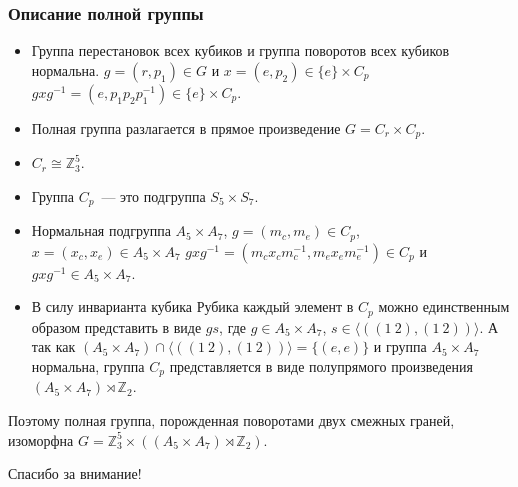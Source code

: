 \documentclass[utf8,russian]{beamer}
\begin{document}
\begin{frame}
\frametitle{Описание полной группы}
\begin{itemize}
	\item Группа перестановок всех кубиков и группа поворотов всех кубиков нормальна. $g=(r,p_1)\in G$ и $x=(e,p_2)\in \{e\}\times C_p$ $gxg^{-1}=(e,p_1p_2p_1^{-1})\in \{e\}\times C_p$.
	\item Полная группа разлагается в прямое произведение $G=C_r\times C_p$.
	\item $C_r\cong \mathbb{Z}_3^5$.
	\item Группа $C_p$~--- это подгруппа $S_5\times S_7$.
	\item Нормальная подгруппа $A_5\times A_7$, $g=(m_c,m_e)\in C_p$, $x=(x_c,x_e)\in A_5\times A_7$ $gxg^{-1}=(m_cx_cm_c^{-1},m_ex_em_e^{-1})\in C_p$ и $gxg^{-1}\in A_5\times A_7$.
	\item В силу инварианта кубика Рубика каждый элемент в $C_p$ можно единственным образом представить в виде $gs$, где $g\in A_5\times A_7$, $s\in \langle((1~2),(1~2))\rangle$.
	А так как $(A_5\times A_7)\cap \langle((1~2),(1~2))\rangle=\{(e,e)\}$ и группа $A_5\times A_7$ нормальна, группа $C_p$ представляется в виде полупрямого произведения $(A_5\times A_7)\rtimes\mathbb{Z}_2$.
\end{itemize}
Поэтому полная группа, порожденная поворотами двух смежных граней, изоморфна $G=\mathbb{Z}_3^5\times ((A_5\times A_7)\rtimes\mathbb{Z}_2)$.
\end{frame}


\begin{frame}
\Huge{\centerline{Спасибо за внимание!}}
\end{frame}

\end{document}
